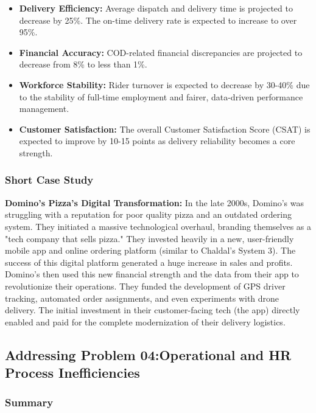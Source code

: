 \documentclass[12pt,a4paper]{article}
\begin{document}
\begin{itemize}
    \item \textbf{Delivery Efficiency:} Average dispatch and delivery time is projected to decrease by 25\%. The on-time delivery rate is expected to increase to over 95\%.
    \item \textbf{Financial Accuracy:} COD-related financial discrepancies are projected to decrease from 8\% to less than 1\%.
    \item \textbf{Workforce Stability:} Rider turnover is expected to decrease by 30-40\% due to the stability of full-time employment and fairer, data-driven performance management.
    \item \textbf{Customer Satisfaction:} The overall Customer Satisfaction Score (CSAT) is expected to improve by 10-15 points as delivery reliability becomes a core strength.
\end{itemize}

\subsubsection{Short Case Study}

\textbf{Domino's Pizza's Digital Transformation:} In the late 2000s, Domino's was struggling with a reputation for poor quality pizza and an outdated ordering system. They initiated a massive technological overhaul, branding themselves as a "tech company that sells pizza." They invested heavily in a new, user-friendly mobile app and online ordering platform (similar to Chaldal's System 3). The success of this digital platform generated a huge increase in sales and profits. Domino's then used this new financial strength and the data from their app to revolutionize their operations. They funded the development of GPS driver tracking, automated order assignments, and even experiments with drone delivery. The initial investment in their customer-facing tech (the app) directly enabled and paid for the complete modernization of their delivery logistics.


\subsection{Addressing Problem 04:Operational and HR Process Inefficiencies}

\subsubsection{Summary}
\end{document}
